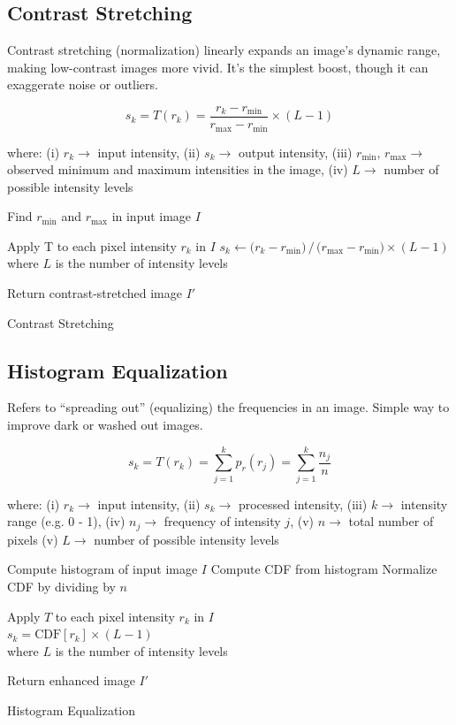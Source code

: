 \subsection*{Contrast Stretching}

Contrast stretching (normalization) linearly expands an image’s
dynamic range, making low-contrast images more vivid. It’s the
simplest boost, though it can exaggerate noise or outliers.

\begin{equation*}
  s_k = T(r_k)
  = \frac{r_k - r_{\min}}{r_{\max} - r_{\min}}
  \times (L - 1)
\end{equation*}

where: (i) $r_k\rightarrow$ input intensity, (ii) $s_k\rightarrow$
output intensity, (iii) $r_{\min},\,r_{\max}\rightarrow$ observed
minimum and maximum intensities in the image, (iv) $L\rightarrow$
number of possible intensity levels

\begin{algorithm}[ht!]
  \DontPrintSemicolon
  Find $r_{\min}$ and $r_{\max}$ in input image $I$ \;

  {
    Apply T to each pixel intensity $r_k$ in $I$ \;
    \nonl $s_k \leftarrow \bigl(r_k -
    r_{\min}\bigr)\,/\,\bigl(r_{\max}-r_{\min}\bigr)\times(L-1)$ \;
    \nonl where $L$ is the number of intensity levels \;
  }

  Return contrast-stretched image $I'$\;
  \caption{Contrast Stretching}
\end{algorithm}

\subsection*{Histogram Equalization}

Refers to \enquote{spreading out} (equalizing) the frequencies in an
image. Simple way to improve dark or washed out images.

\begin{equation*}
  s_k = T(r_k) = \sum_{j=1}^{k} p_r(r_j) = \sum_{j=1}^{k} \frac{n_j}{n}
\end{equation*}

where: (i) $r_k \rightarrow$ input intensity, (ii) $s_k \rightarrow$
processed intensity, (iii) $k \rightarrow$ intensity range (e.g. 0 -
1), (iv) $n_j \rightarrow$ frequency of intensity $j$, (v) $n
\rightarrow$ total number of pixels (v) $L\rightarrow$ number of
possible intensity levels

\begin{algorithm}[ht!]
  \DontPrintSemicolon
  Compute histogram of input image $I$ \;
  Compute CDF from histogram \;
  Normalize CDF by dividing by $n$ \;

  {
    Apply $T$ to each pixel intensity $r_k$ in $I$\\
    \nonl $s_k = \text{CDF}[r_k] \times (L - 1)$ \\
    \nonl where $L$ is the number of intensity levels \;
  }

  Return enhanced image $I'$\;
  \caption{Histogram Equalization}
\end{algorithm}

